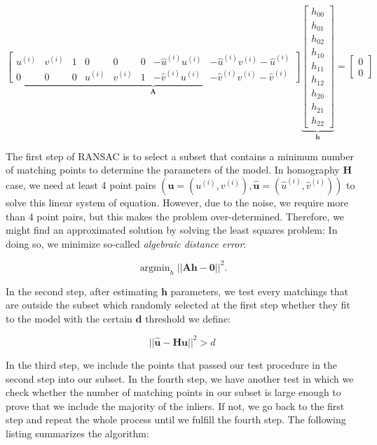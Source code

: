 \documentclass[a4paper]{report}
\numberwithin{figure}{section}
\newcommand{\argmin}{\mathop{\mathrm{argmin}}}
\begin{document}
\begin{equation}
\underbrace{
\begin{bmatrix}
  u^{(i)} & v^{(i)} & 1 & 0 & 0 & 0 & -\hat{u}^{(i)}u^{(i)} & -\hat{u}^{(i)}v^{(i)} -\hat{u}^{(i)}\\
  0 & 0 & 0 & u^{(i)} & v^{(i)} & 1 & -\hat{v}^{(i)}u^{(i)} & -\hat{v}^{(i)}v^{(i)} -\hat{v}^{(i)}
\end{bmatrix}}_{\mathbf{A}}
\underbrace{
\begin{bmatrix}
    h_{00} \\ h_{01} \\ h_{02} \\ h_{10} \\ h_{11} \\ h_{12} \\ h_{20} \\ h_{21} \\ h_{22}
\end{bmatrix}}_{\mathbf{h}}
= 
\begin{bmatrix}
  0\\0
\end{bmatrix}
\end{equation}

The first step of RANSAC is to select a subset that contains a minimum number 
of matching points to determine the parameters of the model. In homography 
$\mathbf{H}$ case, we need at least 4 point pairs 
$(\mathbf{u}=(u^{(i)},v^{(i)}),\mathbf{\hat{u}}=(\hat{u}^{(i)},\hat{v}^{(i)}))$
 to solve this linear system of equation. However, due to the noise, we 
require more than 4 point pairs, but this makes the problem over-determined. 
Therefore, we might find an approximated solution by solving the least squares 
problem: In doing so, we minimize so-called \textit{algebraic distance error}:

\begin{equation}
\argmin_h || \mathbf{Ah-0}||^2.
\end{equation}

In the second step, after estimating $\mathbf{h}$ parameters, we test every 
matchings that are outside the subset which randomly selected at the first 
step whether they fit to the model with the certain $\mathbf{d}$ threshold we 
define:

\begin{equation}
  ||\mathbf{\hat{u}} - \mathbf{H}\mathbf{u}||^2 > d
\end{equation}

In the third step, we include the points that passed our test procedure in the 
second step into our subset. In the fourth step, we have another test in which 
we check whether the number of matching points in our subset is large enough 
to prove that we include the majority of the inliers. If not, we go back to 
the first step and repeat the whole process until we fulfill the fourth step. 
The following listing summarizes the algorithm:
\end{document}
